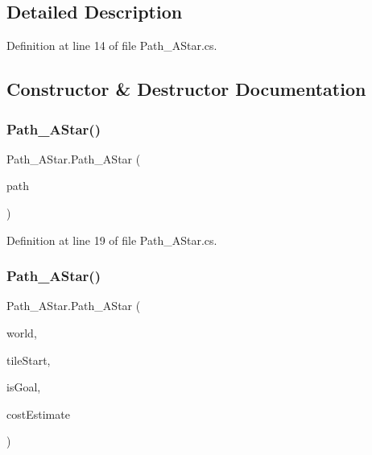 \subsection{Detailed Description}


Definition at line 14 of file Path\+\_\+\+A\+Star.\+cs.



\subsection{Constructor \& Destructor Documentation}
\mbox{\label{class_path___a_star_a63a4d681a61d85b9c7a3914d0522f31c}} 
\subsubsection{\texorpdfstring{Path\+\_\+\+A\+Star()}{Path\_AStar()}\hspace{0.1cm}{\footnotesize\ttfamily [1/2]}}
{\footnotesize\ttfamily Path\+\_\+\+A\+Star.\+Path\+\_\+\+A\+Star (\begin{DoxyParamCaption}\item[{Queue$<$ \hyperlink{class_tile}{Tile} $>$}]{path }\end{DoxyParamCaption})}



Definition at line 19 of file Path\+\_\+\+A\+Star.\+cs.

\mbox{\label{class_path___a_star_ad165a839440045b38c1bf14868fc1e42}} 
\subsubsection{\texorpdfstring{Path\+\_\+\+A\+Star()}{Path\_AStar()}\hspace{0.1cm}{\footnotesize\ttfamily [2/2]}}
{\footnotesize\ttfamily Path\+\_\+\+A\+Star.\+Path\+\_\+\+A\+Star (\begin{DoxyParamCaption}\item[{\hyperlink{class_world}{World}}]{world,  }\item[{\hyperlink{class_tile}{Tile}}]{tile\+Start,  }\item[{Pathfinder.\+Goal\+Evaluator}]{is\+Goal,  }\item[{Pathfinder.\+Pathfinding\+Heuristic}]{cost\+Estimate }\end{DoxyParamCaption})}



